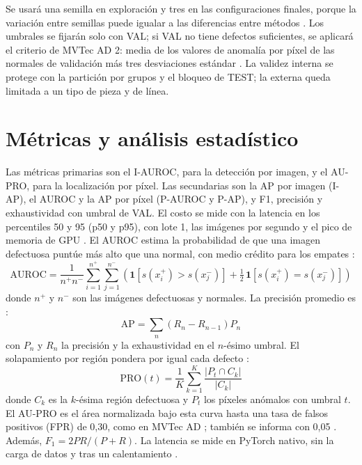 \documentclass[12pt,oneside]{report}
\begin{document}
Se usará una semilla en exploración y tres en las configuraciones finales, porque la variación entre semillas puede igualar a las diferencias entre métodos \cite{bouthillier2021,paez2026}. Los umbrales se fijarán solo con VAL; si VAL no tiene defectos suficientes, se aplicará el criterio de MVTec AD 2: media de los valores de anomalía por píxel de las normales de validación más tres desviaciones estándar \cite{heckler2026}. La validez interna se protege con la partición por grupos y el bloqueo de TEST; la externa queda limitada a un tipo de pieza y de línea.

\section{Métricas y análisis estadístico}
\label{sec:metricas}

Las métricas primarias son el I-AUROC, para la detección por imagen, y el AU-PRO, para la localización por píxel. Las secundarias son la AP por imagen (I-AP), el AUROC y la AP por píxel (P-AUROC y P-AP), y F1, precisión y exhaustividad con umbral de VAL. El costo se mide con la latencia en los percentiles 50 y 95 (p50 y p95), con lote 1, las imágenes por segundo y el pico de memoria de GPU \cite{paez2026}. El AUROC estima la probabilidad de que una imagen defectuosa puntúe más alto que una normal, con medio crédito para los empates \cite{fawcett2006}:
\begin{equation}
  \mathrm{AUROC} = \frac{1}{n^{+} n^{-}} \sum_{i=1}^{n^{+}} \sum_{j=1}^{n^{-}} \left( \mathbf{1}\!\left[s(x_i^{+}) > s(x_j^{-})\right] + \tfrac{1}{2}\,\mathbf{1}\!\left[s(x_i^{+}) = s(x_j^{-})\right] \right)
\end{equation}
donde $n^{+}$ y $n^{-}$ son las imágenes defectuosas y normales. La precisión promedio es \cite{saito2015}:
\begin{equation}
  \mathrm{AP} = \sum_{n} \left(R_n - R_{n-1}\right) P_n
\end{equation}
con $P_n$ y $R_n$ la precisión y la exhaustividad en el $n$-ésimo umbral. El solapamiento por región pondera por igual cada defecto \cite{bergmann2020,bergmann2021}:
\begin{equation}
  \mathrm{PRO}(t) = \frac{1}{K} \sum_{k=1}^{K} \frac{|P_t \cap C_k|}{|C_k|}
\end{equation}
donde $C_k$ es la $k$-ésima región defectuosa y $P_t$ los píxeles anómalos con umbral $t$. El AU-PRO es el área normalizada bajo esta curva hasta una tasa de falsos positivos (FPR) de 0,30, como en MVTec AD \cite{bergmann2021}; también se informa con 0,05 \cite{heckler2026}. Además, $F_1 = 2PR/(P+R)$. La latencia se mide en PyTorch nativo, sin la carga de datos y tras un calentamiento \cite{paez2026}.
\end{document}
